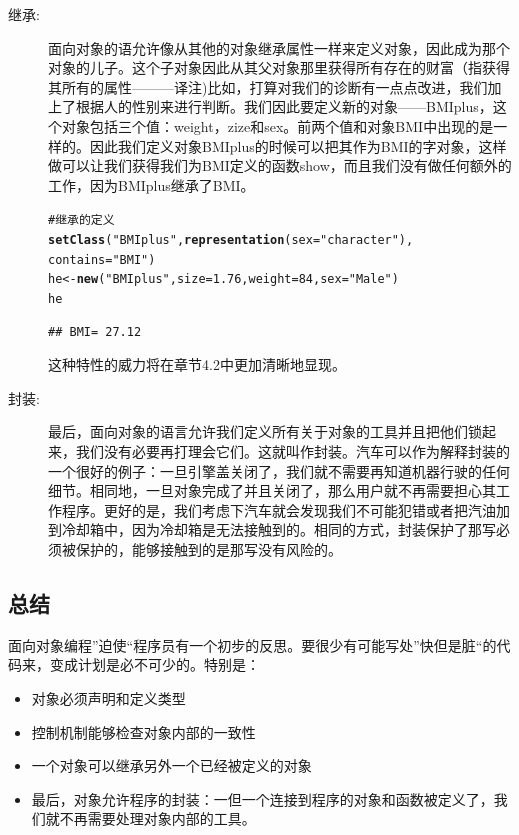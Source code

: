 \documentclass[12pt,a4paper]{article}\usepackage{graphicx, color}
\makeatletter
\newcommand{\hlfunctioncall}[1]{\textcolor[rgb]{0.501960784313725,0,0.329411764705882}{\textbf{#1}}}%
\newcommand{\hlstring}[1]{\textcolor[rgb]{0.6,0.6,1}{#1}}%
\newcommand{\hlcomment}[1]{\textcolor[rgb]{0.180392156862745,0.6,0.341176470588235}{#1}}%
\newenvironment{kframe}{%
 \def\at@end@of@kframe{}%
 \ifinner\ifhmode%
  \def\at@end@of@kframe{\end{minipage}}%
  \begin{minipage}{\columnwidth}%
 \fi\fi%
 \def\FrameCommand##1{\hskip\@totalleftmargin \hskip-\fboxsep
 \colorbox{shadecolor}{##1}\hskip-\fboxsep
     \hskip-\linewidth \hskip-\@totalleftmargin \hskip\columnwidth}%
 \MakeFramed {\advance\hsize-\width
   \@totalleftmargin\z@ \linewidth\hsize
   \@setminipage}}%
 {\par\unskip\endMakeFramed%
 \at@end@of@kframe}
\newenvironment{knitrout}{}{} %
\makeatother
\begin{document}
\begin{description}
\begin{knitrout}
\begin{kframe}
{\ttfamily\noindent\bfseries\color{errorcolor}{\#\# Error: invalid class "BMI" object: negative Size}}\end{kframe}
\end{knitrout}

  \item[继承:]面向对象的语允许像从其他的对象继承属性一样来定义对象，因此成为那个对象的儿子。这个子对象因此从其父对象那里获得所有存在的财富（指获得其所有的属性———译注)比如，打算对我们的诊断有一点点改进，我们加上了根据人的性别来进行判断。我们因此要定义新的对象——BMIplus，这个对象包括三个值：weight，zize和sex。前两个值和对象BMI中出现的是一样的。因此我们定义对象BMIplus的时候可以把其作为BMI的字对象，这样做可以让我们获得我们为BMI定义的函数show，而且我们没有做任何额外的工作，因为BMIplus继承了BMI。
\begin{knitrout}
\color{fgcolor}\begin{kframe}
\begin{alltt}
\hlcomment{# 继承的定义}
\hlfunctioncall{setClass}(\hlstring{"BMIplus"}, \hlfunctioncall{representation}(sex = \hlstring{"character"}), 
    contains = \hlstring{"BMI"})
he <- \hlfunctioncall{new}(\hlstring{"BMIplus"}, size = 1.76, weight = 84, sex = \hlstring{"Male"})
he
\end{alltt}
\begin{verbatim}
## BMI= 27.12
\end{verbatim}
\end{kframe}
\end{knitrout}

这种特性的威力将在章节4.2中更加清晰地显现。

  \item[封装:]最后，面向对象的语言允许我们定义所有关于对象的工具并且把他们锁起来，我们没有必要再打理会它们。这就叫作封装。汽车可以作为解释封装的一个很好的例子：一旦引擎盖关闭了，我们就不需要再知道机器行驶的任何细节。相同地，一旦对象完成了并且关闭了，那么用户就不再需要担心其工作程序。更好的是，我们考虑下汽车就会发现我们不可能犯错或者把汽油加到冷却箱中，因为冷却箱是无法接触到的。相同的方式，封装保护了那写必须被保护的，能够接触到的是那写没有风险的。
\end{description}

\subsection{总结}
面向对象编程”迫使“程序员有一个初步的反思。要很少有可能写处”快但是脏“的代码来，变成计划是必不可少的。特别是：
\begin{itemize}
  \item 对象必须声明和定义类型
  \item 控制机制能够检查对象内部的一致性
  \item 一个对象可以继承另外一个已经被定义的对象
  \item 最后，对象允许程序的封装：一但一个连接到程序的对象和函数被定义了，我们就不再需要处理对象内部的工具。
\end{itemize}
\end{document}
